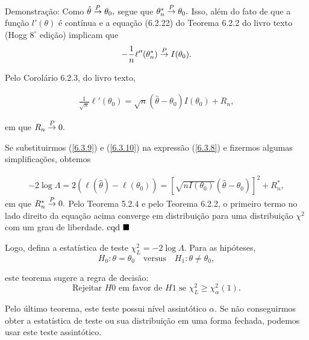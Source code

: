 \documentclass[12pt]{beamer}
\begin{document}
\begin{frame}{}
\begin{block}{Demonstração:}
\justifying
Como $\hat{\theta} \overset{P}{\rightarrow} \theta_0,$ segue que $\theta^*_n \overset{P}{\rightarrow} \theta_0.$ Isso, além do fato de que a função $l'(\theta)$ é contínua e a equação (6.2.22) do Teorema 6.2.2 do livro texto (Hogg $8^{\circ}$ edição) implicam que
\begin{align}\label{6.3.9}
    -\frac{1}{n}\ell''(\theta^{*}_{n}) \overset{P}{\rightarrow} I(\theta_0).
\end{align}

Pelo Corolário 6.2.3, do livro texto,

\begin{align}\label{6.3.10}
   \frac{1}{\sqrt{n}}\ell'(\theta_{0}) = \sqrt{n}(\hat{\theta} - \theta_0)I(\theta_0) + R_n, 
\end{align}

em que $R_n \overset{P}{\rightarrow} 0.$ 

\end{block}
\end{frame}

\begin{frame}{}
\begin{block}{}
\justifying
Se substituirmos (\ref{6.3.9}) e (\ref{6.3.10}) na expressão (\ref{6.3.8}) e fizermos algumas simplificações, obtemos

\begin{align*}
    -2 \log \Lambda = 2(\ell(\hat{\theta}) - \ell(\theta_{0})) = \left[\sqrt{nI(\theta_0)}(\hat{\theta} - \theta_0)\right]^2 + R^*_n,
\end{align*}
em que $R^*_n \overset{P}{\rightarrow} 0.$ Pelo Teorema 5.2.4 e pelo Teorema 6.2.2, o primeiro termo no lado direito da equação acima converge em distribuição para uma distribuição $\chi^2$ com um grau de liberdade. $\text{cqd}~\blacksquare$
\end{block}
\end{frame}

\begin{frame}{}
\begin{block}{}
\justifying
Logo, defina a estatística de teste $\chi^2_L = -2 \log \Lambda.$ Para as hipóteses, 
\[ H_0 : \theta = \theta_0 \quad \text{versus} \quad H_1 : \theta \neq \theta_0, \]

este teorema sugere a regra de decisão:
\[
\text{Rejeitar } H0 \text{ em favor de } H1 \text{ se } \chi^2_L \geq \chi^2_\alpha(1).
\]

Pelo último teorema, este teste possui nível assintótico $\alpha.$ Se não conseguirmos obter a estatística de teste ou sua distribuição em uma forma fechada, podemos usar este teste assintótico.
\end{block}
\end{frame}
\end{document}
